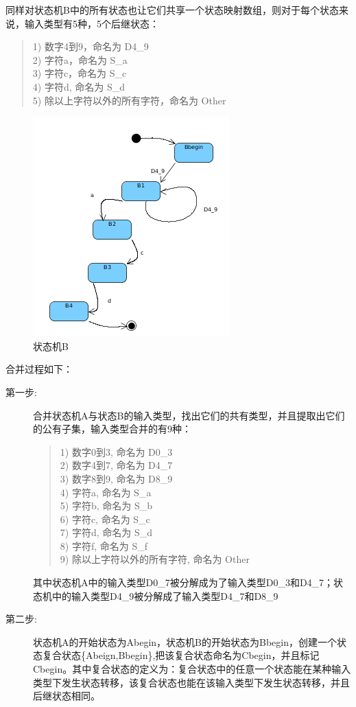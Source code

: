 \documentclass[a4paper,11pt]{article}
\begin{document}
\begin{CJK}{UTF8}{gbsn}
同样对状态机B中的所有状态也让它们共享一个状态映射数组，则对于每个状态来说，输入类型有5种，5个后继状态：
\begin{quote}
1) 数字4到9，命名为 D4\_9 \\
2) 字符a，命名为 S\_a \\
3) 字符c，命名为 S\_c \\
4) 字符d, 命名为 S\_d \\
5) 除以上字符以外的所有字符，命名为 Other
\end{quote}
\begin{figure}
 \centering
 \includegraphics[scale=1]{s_b.png}
 \caption{状态机B}
 \label{fig:state_b}
\end{figure}
合并过程如下：
\begin{description}
\item[第一步:]合并状态机A与状态B的输入类型，找出它们的共有类型，并且提取出它们的公有子集，输入类型合并的有9种：
\begin{quote}
1) 数字0到3, 命名为 D0\_3 \\
2) 数字4到7, 命名为 D4\_7 \\
3) 数字8到9, 命名为 D8\_9 \\
4) 字符a,  命名为 S\_a \\
5) 字符b,  命名为 S\_b \\
6) 字符c,  命名为 S\_c \\
7) 字符d,  命名为 S\_d \\
8) 字符f,  命名为 S\_f \\
9) 除以上字符以外的所有字符, 命名为 Other
\end{quote}
其中状态机A中的输入类型D0\_7被分解成为了输入类型D0\_3和D4\_7；状态机中的输入类型D4\_9被分解成了输入类型D4\_7和D8\_9
\item[第二步:]状态机A的开始状态为Abegin，状态机B的开始状态为Bbegin，创建一个状态复合状态\{Abeign,Bbegin\},把该复合状态命名为Cbegin，并且标记Cbegin。其中复合状态的定义为：复合状态中的任意一个状态能在某种输入类型下发生状态转移，该复合状态也能在该输入类型下发生状态转移，并且后继状态相同。

\end{description}
\end{CJK}
\end{document}
